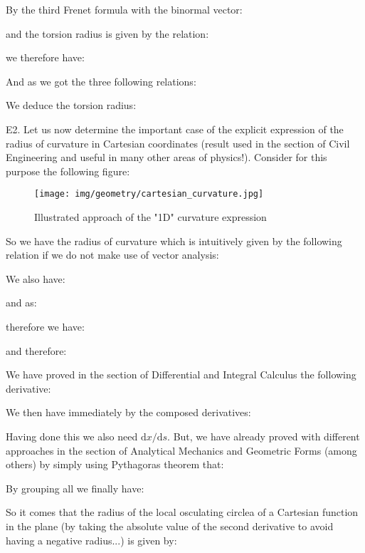 {\begin{tcolorbox}[colframe=black,colback=white,sharp corners]
	By the third Frenet formula with the binormal vector:
	
	and the torsion radius is given by the relation:
	
	we therefore have:
	\end{tcolorbox}
	
	\pagebreak
	\begin{tcolorbox}[colframe=black,colback=white,sharp corners]
	
	And as we got the three following relations:
	
	We deduce the torsion radius:
	
	
	E2. Let us now determine the important case of the explicit expression of the radius of curvature in Cartesian coordinates (result used in the section of Civil Engineering and useful in many other areas of physics!). Consider for this purpose the following figure:
	\begin{figure}[H]
		\centering
		\texttt{[image: img/geometry/cartesian\_curvature.jpg]}
		\caption[]{Illustrated approach of the "1D" curvature expression}
	\end{figure}
	So we have the radius of curvature which is intuitively given by the following relation if we do not make use of vector analysis:
	
	We also have:
	
	and as:
	
	\end{tcolorbox}
	
	\pagebreak
	\begin{tcolorbox}[colframe=black,colback=white,sharp corners]
	therefore we have:
	
	and therefore:
	
	We have proved in the section of Differential and Integral Calculus the following derivative:	
	
	We then have immediately by the composed derivatives:
	
	Having done this we also need $\mathrm{d}x/\mathrm{d}s$. But, we have already proved with different approaches in the section of Analytical  Mechanics and Geometric Forms (among others) by simply using Pythagoras theorem that:
	
	By grouping all we finally have:
	
	So it comes that the radius of the local osculating circlea of a Cartesian function in the plane (by taking the absolute value of the second derivative to avoid having a negative radius...) is given by:
	
	\end{tcolorbox}
	
}
